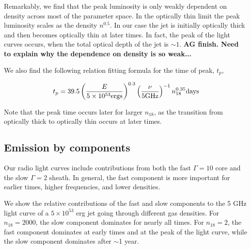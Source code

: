 \documentclass[usenatbib,fleqn]{mnras}
\begin{document}
Remarkably, we find that the peak luminosity is only weakly dependent
on density across most of the parameter space. In the optically thin
limit the peak luminosity scales as the density $n^{0.5}$. In our case
the jet is initially optically thick and then becomes optically thin
at later times. In fact, the peak of the light curves occurs, when the
total optical depth of the jet is $\sim 1$. {\bf AG finish. Need to
  explain why the dependence on density is so weak...}


We also find the following relation fitting formula for the time of
peak, $t_p$, 

\begin{equation}
t_p = 39.5 \left(\frac{E}{5 \times 10^{53} {\rm ergs}}\right)^{0.3} 
\left(\frac{\nu}{5 {\rm GHz}}\right)^{-1} n_{18}^{0.35} {\rm days}
\label{eq:peakTime}
\end{equation}

Note that the peak time occurs later for larger $n_{18}$, as the
transition from optically thick to optically thin occurs at later times.

\subsection{Emission by components}
Our radio light curves include contributions from both the fast
$\Gamma=10$ core and the slow $\Gamma=2$ sheath. In general, the fast
component is more important for earlier times, higher frequencies, and
lower densities. 

We show the relative contributions of the fast and slow components to
the 5 GHz light curve of a $5 \times 10^{53}$ erg jet going through
different gas densities. For $n_{18}=2000$, the slow component
dominates for nearly all times.  For $n_{18}=2$, the fast component
dominates at early times and at the peak of the light curve, while the
slow component dominates after $\sim$1 year.
\end{document}
